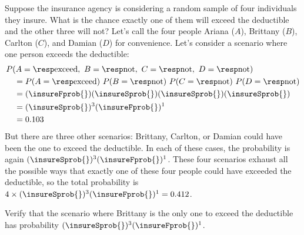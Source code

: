 \begin{examplewrap}
\begin{nexample}{Suppose the insurance agency is considering
    a random sample of four individuals they insure.
    What is the chance exactly one of them will exceed
    the deductible and the other three will not?
    Let's call the four people
    Ariana ($A$),
    Brittany ($B$),
    Carlton ($C$),
    and Damian ($D$)
    for convenience.}
  \label{insureOneOfFourExceedsDeductible}%
  Let's consider a scenario where one person exceeds
  the deductible:
  \begin{align*}
  &P(A=\text{\insureF{}},
      \text{ }B=\text{\insureS{}},
      \text{ }C=\text{\insureS{}},
      \text{ }D=\text{\insureS{}}) \\
    &\quad = P(A=\text{\insureF{}})\ 
        P(B=\text{\insureS{}})\ 
        P(C=\text{\insureS{}})\ 
        P(D=\text{\insureS{}}) \\
    &\quad =  (\insureFprob{})
        (\insureSprob{})
        (\insureSprob{})
        (\insureSprob{}) \\
    &\quad = (\insureSprob{})^3 (\insureFprob{})^1 \\
    &\quad = \insureBinomCinDSingleScenario{}
  \end{align*}
  But there are three other scenarios: Brittany, Carlton,
  or Damian could have been the one to exceed the deductible.
  In each of these cases, the probability is again
  $(\insureSprob{})^3 (\insureFprob{})^1$.
  These four scenarios exhaust all the possible ways that
  exactly one of these four people could have exceeded
  the deductible, so the total probability is
  $4 \times (\insureSprob{})^3 (\insureFprob{})^1
      = \insureBinomCinD{}$.
\end{nexample}
\end{examplewrap}

\begin{exercisewrap}
\begin{nexercise}
Verify that the scenario where Brittany is the only one
to exceed the deductible has probability
$(\insureSprob{})^3 (\insureFprob{})^1$.~\footnotemark{}
\end{nexercise}
\end{exercisewrap}


